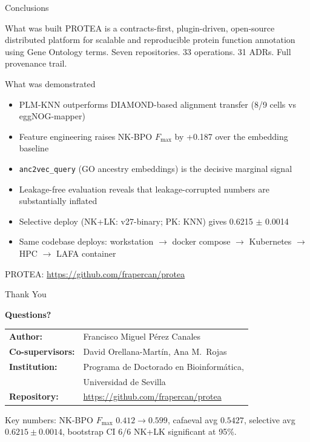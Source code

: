 \documentclass[12pt, aspectratio=169]{beamer}
\newcommand{\fmax}{$F_{\max}$}
\begin{document}
\begin{frame}{Conclusions}
  \begin{block}{What was built}
    PROTEA is a contracts-first, plugin-driven, open-source distributed platform for
    scalable and reproducible protein function annotation using Gene Ontology terms.
    Seven repositories. 33 operations. 31 ADRs. Full provenance trail.
  \end{block}
  \vspace{0.5em}
  \begin{block}{What was demonstrated}
    \begin{itemize}
      \item PLM-KNN outperforms DIAMOND-based alignment transfer (8/9 cells vs eggNOG-mapper)
      \item Feature engineering raises NK-BPO \fmax{} by +0.187 over the embedding baseline
      \item \texttt{anc2vec\_query} (GO ancestry embeddings) is the decisive marginal signal
      \item Leakage-free evaluation reveals that leakage-corrupted numbers are substantially inflated
      \item Selective deploy (NK+LK: v27-binary; PK: KNN) gives 0.6215 $\pm$ 0.0014
      \item Same codebase deploys: workstation $\to$ docker compose $\to$ Kubernetes $\to$ HPC $\to$ LAFA container
    \end{itemize}
  \end{block}
  \vspace{0.3em}
  {\small PROTEA: \url{https://github.com/frapercan/protea}}
\end{frame}

\begin{frame}{Thank You}
  \begin{center}
    \vspace{1.5em}
    {\Large\textbf{Questions?}}
    \vspace{2em}

    \begin{tabular}{ll}
      \textbf{Author:} & Francisco Miguel P\'{e}rez Canales \\
      \textbf{Co-supervisors:} & David Orellana-Mart\'{i}n, Ana M.\ Rojas \\
      \textbf{Institution:} & Programa de Doctorado en Bioinform\'{a}tica, \\
                            & Universidad de Sevilla \\
      \textbf{Repository:} & \url{https://github.com/frapercan/protea} \\
    \end{tabular}

    \vspace{2em}
    {\small
      Key numbers: NK-BPO \fmax{} $0.412 \to 0.599$,
      cafaeval avg $0.5427$,
      selective avg $0.6215 \pm 0.0014$,
      bootstrap CI 6/6 NK+LK significant at 95\%.
    }
  \end{center}
\end{frame}
\end{document}
